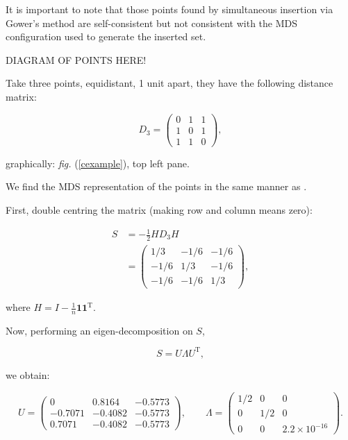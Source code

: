 \documentclass[a4paper,10pt]{amsart}
\newcommand{\fig}[1]{\emph{fig.} (\ref{#1})}
\newcommand{\cross}{\times}
\begin{document}
It is important to note that those points found by simultaneous insertion via Gower's method are self-consistent but not consistent with the MDS configuration used to generate the inserted set.

DIAGRAM OF POINTS HERE!

Take three points, equidistant, 1 unit apart, they have the following distance matrix:

\begin{equation}
D_3 = \begin{pmatrix} 0 & 1& 1\\1 & 0 & 1\\ 1 & 1 & 0\end{pmatrix},
\end{equation}

graphically: \fig{cexample}, top left pane.

We find the MDS representation of the points in the same manner as \cite{diaconis08}.

First, double centring the matrix (making row and column means zero):

\begin{equation}
\begin{aligned}
S &= -\frac{1}{2} HD_3H\\
    &= \begin{pmatrix} 1/3 & -1/6 & -1/6\\-1/6 & 1/3 & -1/6\\ -1/6 & -1/6 & 1/3\end{pmatrix},
\end{aligned}
\end{equation}

where $H=I-\frac{1}{n}\mathbf{1}\mathbf{1}^\text{T}$.

Now, performing an eigen-decomposition on $S$,

\begin{equation}
S = U \Lambda U^\text{T},
\end{equation}

we obtain:

\begin{equation}
U = \begin{pmatrix} 
	0 & 0.8164 & -0.5773\\
	-0.7071 & -0.4082 & -0.5773\\ 
	0.7071 & -0.4082 & -0.5773
	\end{pmatrix},\qquad
\Lambda = \begin{pmatrix} 
	1/2 & 0 & 0\\
	0 & 1/2 & 0\\ 
	0 & 0 & 2.2\cross10^{-16}
\end{pmatrix}.
\end{equation}
\end{document}
